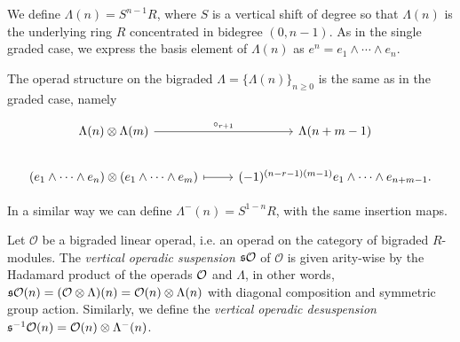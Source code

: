 \documentclass[join.tex]{subfiles}
\begin{document}


We define $\Lambda(n)=S^{n-1}R$, where  $S$ is a vertical shift of degree so that $\Lambda(n)$ is the underlying ring $R$ concentrated in bidegree  $(0,n-1)$. As in the single graded case, we express the basis element of $\Lambda(n)$ as $e^n=e_1\land\cdots\land e_n$.

The operad structure on the bigraded $\Lambda=\{\Lambda(n)\}_{n\geq 0}$ is the same as in the graded case, namely

\[
\begin{tikzcd}
\Lambda(n)\otimes\Lambda(m) \arrow[r, "\circ_{r+1}"] & \Lambda(n+m-1)\\
(e_1\land\cdots\land e_n)\otimes(e_1\land\cdots\land e_m)\arrow[r, mapsto] & (-1)^{(n-r-1)(m-1)}e_1\land\cdots\land e_{n+m-1}.
\end{tikzcd}
\]



In a similar way we can define $\Lambda^-(n)=S^{1-n}R$, with the same insertion maps.
\begin{definition}
Let $\mathcal{O}$ be a bigraded linear operad, i.e. an operad on the category of bigraded $R$-modules. The \emph{vertical operadic suspension} $\mathfrak{s}{\mathcal O}$ of $\mathcal{O}$ is given arity-wise by the Hadamard product of the operads ${\mathcal O}$ and $\Lambda$, in other words, $\mathfrak{s}{\mathcal O}(n)=(\mathcal{O}\otimes\Lambda)(n)=\mathcal{O}(n)\otimes\Lambda(n)$ with diagonal composition and symmetric group action. Similarly, we define the \emph{vertical operadic desuspension} $\mathfrak{s}^{-1}{\mathcal O}(n)=\mathcal{O}(n)\otimes\Lambda^-(n)$. %
\end{definition}
\end{document}
